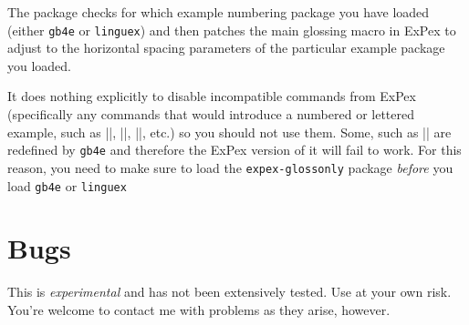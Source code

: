 \documentclass[11pt]{article}
\newcommand*{\pkg}[1]{\texttt{#1}\xspace}
\begin{document}
The package checks for which example numbering package you have loaded (either \pkg{gb4e} or \pkg{linguex}) and then patches the main glossing macro in ExPex to adjust to the horizontal spacing parameters of the particular example package you loaded.

It does nothing explicitly to disable incompatible commands from ExPex (specifically any commands that would introduce a numbered or lettered example, such as |\ex|, |\pex|, |\a|, etc.) so you should not use them. Some, such as |\ex| are redefined by \pkg{gb4e} and therefore the ExPex version of it will fail to work.  For this reason, you need to make sure to load the \pkg{expex-glossonly} package \emph{before} you load \pkg{gb4e} or \pkg{linguex}
\section{Bugs}
This is \emph{experimental} and has not been extensively tested. Use at your own risk. You're welcome to contact me with problems as they arise, however.
\end{document}
